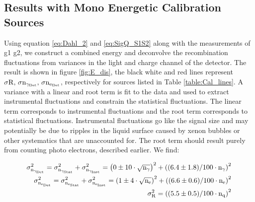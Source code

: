 \subsection{Results with Mono Energetic Calibration Sources}

Using equation \ref{eq:Dahl_2} and \ref{eq:SigQ_S1S2} along with the measurements of g1 g2, we construct a combined energy and deconvolve the recombination fluctuations from variances in the light and charge channel of the detector. The result is shown in figure \ref{fig:E_dis}, the black white and red lines represent $\rm \sigma R, \, \sigma n_{\gamma_{Det}}, \,\sigma n_{e_{Det}}$, respectively for sources listed in Table \ref{table:Cal_lines}. A variance with a linear and root term is fit to the data and used to extract instrumental fluctuations and constrain the statistical fluctuations. The linear term corresponds to instrumental fluctuations and the root term corresponds to statistical fluctuations. Instrumental fluctuations go like the signal size and may potentially be due to ripples in the liquid surface caused by xenon bubbles or other systematics that are unaccounted for. The root term should result purely from counting photo electrons, described earlier. We find:


\begin{equation}
\begin{split}
\rm  \sigma_{n_{\gamma_{Det}}}^2 = \sigma_{n_{\gamma_{Stat}}}^2 + \sigma_{n_{\gamma_{Inst}}}^2 =\left(0 \pm10\cdot \sqrt{n_\gamma}\right)^2 + \left((6.4\pm1.8)/100\cdot n_\gamma\right)^2 \\
\rm \sigma_{n_{e_{Det}}}^2 = \sigma_{n_{e_{Stat}}}^2 + \sigma_{n_{e_{Inst}}}^2 = \left(1\pm4\cdot \sqrt{n_e}\right)^2 + \left((6.6\pm0.6)/100\cdot n_e\right)^2 \\
\rm \sigma_R^2=   \left((5.5\pm0.5)/100\cdot n_q\right)^2
\label{eq:Inst_Fit}
\end{split}
\end{equation}

